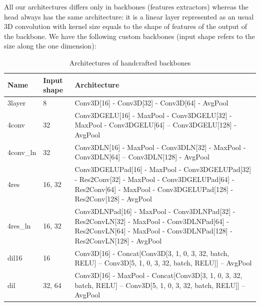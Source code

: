 \documentclass[twocolumn, a4paper]{article}
\theoremstyle{definition}
\begin{document}
All our architectures differs only in backbones (features extractors) whereas the head always
has the same architecture: it is a linear layer represented as an usual 3D convolution with kernel size
equals to the shape of features of the output of the backbone. We have the following custom backbones
(input shape refers to the size along the one dimension):
\begin{table}[ht]
    \begin{tabular}{p{1.2cm}p{1cm}p{5.3cm}}
        Name      & Input shape & Architecture                                                                                                                                                         \\
        \toprule
        3layer    & 8           & Conv3D[16] - Conv3D[32] - Conv3D[64] - AvgPool                                                                                                                       \\
        \hline
        4conv     & 32          & Conv3DGELU[16] - MaxPool - Conv3DGELU[32] - MaxPool - Conv3DGELU[64] -- Conv3DGELU[128] - AvgPool                                                                    \\
        \hline
        4conv\_ln & 32          & Conv3DLN[16] - MaxPool - Conv3DLN[32] - MaxPool - Conv3DLN[64] -- Conv3DLN[128] - AvgPool                                                                            \\
        \hline
        4res      & 16, 32      & Conv3DGELUPad[16] - MaxPool - Conv3DGELUPad[32] - Res2Conv[32] - MaxPool - Conv3DGELUPad[64] - Res2Conv[64] - MaxPool - Conv3DGELUPad[128] - Res2Conv[128] - AvgPool \\
        \hline
        4res\_ln  & 16, 32      & Conv3DLNPad[16] - MaxPool - Conv3DLNPad[32] - Res2ConvLN[32] - MaxPool - Conv3DLNPad[64] - Res2ConvLN[64] - MaxPool - Conv3DLNPad[128] - Res2ConvLN[128] - AvgPool   \\
        \hline
        dil16     & 16          & Conv3D[16] - Concat[Conv3D[3, 1, 0, 3, 32, batch, RELU] -- Conv3D[5, 1, 0, 3, 32, batch, RELU]] --  AvgPool                                                          \\
        \hline
        dil       & 32, 64      & Conv3D[16] - MaxPool - Concat[Conv3D[3, 1, 0, 3, 32, batch, RELU] -- Conv3D[5, 1, 0, 3, 32, batch, RELU]] --  AvgPool                                                \\
        \bottomrule
    \end{tabular}
    \caption{Architectures of handcrafted backbones}
\end{table}
\end{document}
